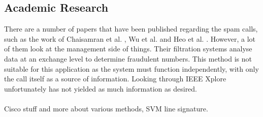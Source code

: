 \documentclass[main.tex]{subfiles}
\begin{document}
\subsection{Academic Research}
There are a number of papers that have been published regarding the spam calls, such as the work of Chaisamran et al. \cite{chaisa}, Wu et al. \cite{wu} and Heo et al. \cite{heo}. However, a lot of them look at the management side of things. Their filtration systems analyse data at an exchange level to determine fraudulent numbers. This method is not suitable for this application as the system must function independently, with only the call itself as a source of information. Looking through IEEE Xplore unfortunately has not yielded as much information as desired.
\\\\
Cisco stuff and more about various methods, SVM line signature.
\end{document}
